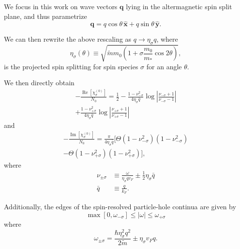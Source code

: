 \documentclass[aps,prb,reprint,twocolumns,superscriptaddress,nofootinbib]{revtex4-2}
\DeclareMathOperator{\Imm}{Im}
\DeclareMathOperator{\Ree}{Re}
\newcommand{\mdos}{\tilde{m}}
\newcommand{\kF}{k_{F}}
\begin{document}
	 
	We focus in this work on wave vectors $\bm q$ lying in the altermagnetic spin split plane, and thus parametrize
		\begin{equation}
			\bm q = q\cos\theta\,\hat{\bm x} + q\sin\theta\,\hat{\bm y}.
		\end{equation}
	
	We can then rewrite the above rescaling as $q\rightarrow \eta_\sigma q$, where
	\begin{equation}
		\eta_{\sigma}(\theta) \equiv \sqrt{\mdos m_0\left( 1+\sigma \frac{m_0}{m_*}\cos2\theta\right)} \label{eq:sigma},
	\end{equation}
	is the projected spin splitting for spin species $\sigma$ for an angle $\theta$. 
	
	We then directly obtain
	\begin{multline}
		-\frac{\Ree[\chi_\sigma^{(0)}]}{N_0} = \frac{1}{2}-\frac{1-\nu_{-\sigma}^2}{4\eta_\sigma \bar q}\log\left|\frac{\nu_{-\sigma}+1}{\nu_{-\sigma}-1}\right|\\+\frac{1-\nu_{+\sigma}^2}{4\eta_\sigma \bar q}\log\left|\frac{\nu_{+\sigma}+1}{\nu_{+\sigma}-1}\right| \label{eq:rechi0}
	\end{multline}
	and
	\begin{multline}
		-\frac{\Imm[\chi_\sigma^{(0)}]}{N_0} = \frac{\pi }{4\eta_\sigma \bar q}\Bigr[\Theta(1-\nu_{-\sigma}^2)(1-\nu_{-\sigma}^2)\\
		-\Theta(1-\nu_{+\sigma}^2)(1-\nu_{+\sigma}^2)\Bigr], \label{eq:imchi0}
	\end{multline}
	where 
	\begin{align}
		\nu_{\pm\sigma} &\equiv \frac{\omega}{\eta_\sigma qv_F} \pm \frac{1}{2}\eta_\sigma \bar q \\
		\bar q &\equiv \frac{q}{\kF}.
	\end{align}

	Additionally, the edges of the spin-resolved particle-hole continua are given by 
	\begin{equation}
		\max[0,\omega_{-\sigma}] \leq |\omega| \leq \omega_{+\sigma} \label{eq:boundaries}
	\end{equation}
	where 
	\begin{equation}
		\omega_{\pm\sigma} = \frac{\hbar \eta_\sigma^2q^2}{2\mdos} \pm \eta_\sigma v_F q.\label{eq:omegapm}
	\end{equation}
\end{document}
